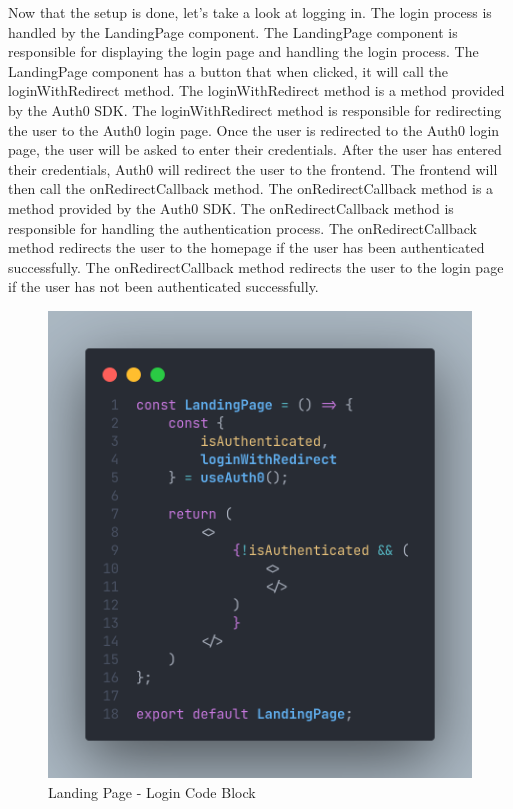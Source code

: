\begin{justify}
        \vspace{0.25cm}
        \newendline Now that the setup is done, let's take a look at logging in. The login process is handled by the LandingPage component. The LandingPage component is responsible for displaying the login page and handling the login process.  The LandingPage component has a button that when clicked, it will call the loginWithRedirect method. The loginWithRedirect method is a method provided by the Auth0 SDK. The loginWithRedirect method is responsible for redirecting the user to the Auth0 login page. Once the user is redirected to the Auth0 login page, the user will be asked to enter their credentials. After the user has entered their credentials, Auth0 will redirect the user to the frontend. The frontend will then call the onRedirectCallback method. The onRedirectCallback method is a method provided by the Auth0 SDK. The onRedirectCallback method is responsible for handling the authentication process. The onRedirectCallback method redirects the user to the homepage if the user has been authenticated successfully. The onRedirectCallback method redirects the user to the login page if the user has not been authenticated successfully.

        \begin{figure}[H]
            \centerline{\includegraphics[width=150mm,scale=1]{figures/implementation_and_testing/implementation/frontend/login.png}}
            \caption{Landing Page - Login Code Block}
        \end{figure}


\end{justify}
